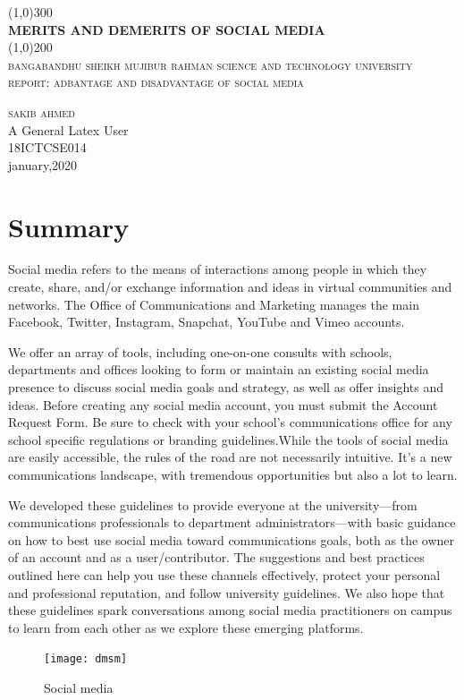 \documentclass[a4paper]{article}
\begin{document}
  \begin{titlepage}
  \begin{center}
  \line(1,0){300}\\
  [.25in]
  \huge{\bfseries MERITS AND DEMERITS OF SOCIAL MEDIA}\\
  [2mm]
  \line(1,0){200}\\
  [1.5cm]
  \textsc{\LARGE bangabandhu sheikh mujibur rahman science and technology university}\\
  [.75cm]
  \textsc{\Large report:  adbantage and disadvantage of social media }\\
  [10cm]
  \end{center}
  
  \begin{flushright}
  \textsc{\huge sakib ahmed}\\
  A General Latex User\\
  18ICTCSE014\\
  january,2020
  \end{flushright}
  \end{titlepage}
  
 \section*{Summary}
 
Social media refers to the means of interactions among people in which they create, share, and/or exchange information and ideas in virtual communities and networks. The Office of Communications and Marketing manages the main Facebook, Twitter, Instagram, Snapchat, YouTube and Vimeo accounts.

We offer an array of tools, including one-on-one consults with schools, departments and offices looking to form or maintain an existing social media presence to discuss social media goals and strategy, as well as offer insights and ideas. Before creating any social media account, you must submit the Account Request Form. Be sure to check with your school’s communications office for any school specific regulations or branding guidelines.While the tools of social media are easily accessible, the rules of the road are not necessarily intuitive. It’s a new communications landscape, with tremendous opportunities but also a lot to learn.

We developed these guidelines to provide everyone at the university—from communications professionals to department administrators—with basic guidance on how to best use social media toward communications goals, both as the owner of an account and as a user/contributor. The suggestions and best practices outlined here can help you use these channels effectively, protect your personal and professional reputation, and follow university guidelines. We also hope that these guidelines spark conversations among social media practitioners on campus to learn from each other as we explore these emerging platforms.
\begin{figure}[h]
\centering
\texttt{[image: dmsm]}
\caption{Social media}
\end{figure}
\end{document}

